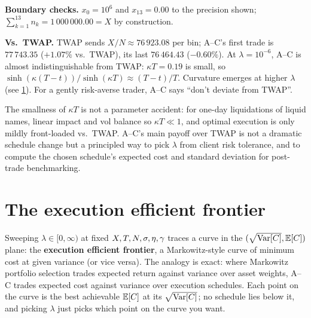 \textbf{Boundary checks.} $x_0 = 10^6$ and $x_{13} = 0.00$ to the
precision shown; $\sum_{k=1}^{13} n_k = 1\,000\,000.00 = X$ by
construction.

\textbf{Vs.\ TWAP.} TWAP sends $X/N \approx 76\,923.08$ per bin;
A--C's first trade is $77\,743.35$ ($+1.07\%$ vs.\ TWAP), its
last $76\,464.43$ ($-0.60\%$). At $\lambda = 10^{-6}$, A--C is
almost indistinguishable from TWAP: $\kappa T = 0.19$ is small,
so $\sinh(\kappa(T-t))/\sinh(\kappa T) \approx (T-t)/T$. Curvature
emerges at higher $\lambda$ (see \cref{sec:ac_frontier}). For a
gently risk-averse trader, A--C says ``don't deviate from TWAP''.

\begin{intuitionbox}
The smallness of $\kappa T$ is not a parameter accident: for
one-day liquidations of liquid names, linear impact and vol balance
so $\kappa T \ll 1$, and optimal execution is only mildly
front-loaded vs.\ TWAP. A--C's main payoff over TWAP is not a
dramatic schedule change but a principled way to pick
$\lambda$ from client risk tolerance, and to compute the chosen
schedule's expected cost and standard deviation for post-trade
benchmarking.
\end{intuitionbox}

\section{The execution efficient frontier}
\label{sec:ac_frontier}

Sweeping $\lambda \in [0,\infty)$ at fixed $X, T, N, \sigma,
\eta, \gamma$ traces a curve in the $(\sqrt{\operatorname{Var}[C]}, \mathbb{E}[C])$
plane: the \textbf{execution efficient frontier}, a Markowitz-style
curve of minimum cost at given variance (or vice versa). The analogy
is exact: where Markowitz portfolio selection trades expected return
against variance over asset weights, A--C trades expected cost
against variance over execution schedules. Each point on the curve
is the best achievable $\mathbb{E}[C]$ at its $\sqrt{\operatorname{Var}[C]}$; no schedule
lies below it, and picking $\lambda$ just picks which point on the
curve you want.

